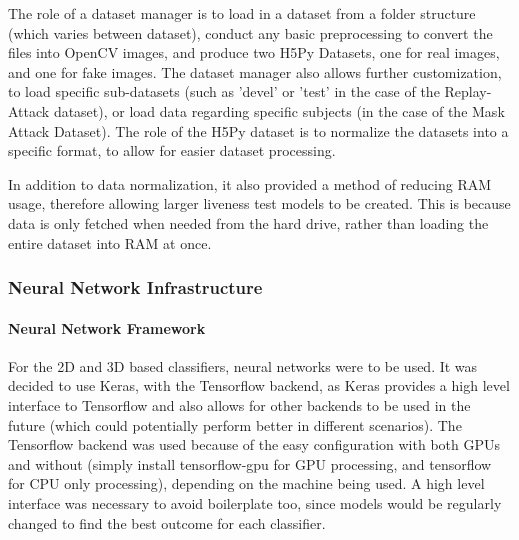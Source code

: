 \documentclass[10pt,a4paper]{article}
\begin{document}
        The role of a dataset manager is to load in a dataset from a folder structure (which varies between dataset), conduct any basic preprocessing to convert the files into OpenCV images,
        and produce two H5Py Datasets, one for real images, and one for fake images. The dataset manager also allows further customization, to load specific sub-datasets (such as 'devel' or 'test' in the case
        of the Replay-Attack dataset), or load data regarding specific subjects (in the case of the Mask Attack Dataset). The role of the H5Py dataset is to normalize the datasets into a specific format,
        to allow for easier dataset processing.

        In addition to data normalization, it also provided a method of reducing RAM usage, therefore allowing larger liveness test models to be created. This is because data is only fetched when needed
        from the hard drive, rather than loading the entire dataset into RAM at once.

        \subsubsection{Neural Network Infrastructure}
            
            \paragraph{Neural Network Framework} 
            For the 2D and 3D based classifiers, neural networks were to be used. It was decided to use Keras, with the Tensorflow backend, as Keras provides a high level interface to Tensorflow
            and also allows for other backends to be used in the future (which could potentially perform better in different scenarios). The Tensorflow backend was used because of the easy configuration
            with both GPUs and without (simply install tensorflow-gpu for GPU processing, and tensorflow for CPU only processing), depending on the machine being used. A high level interface was necessary
            to avoid boilerplate too, since models would be regularly changed to find the best outcome for each classifier.
\end{document}
